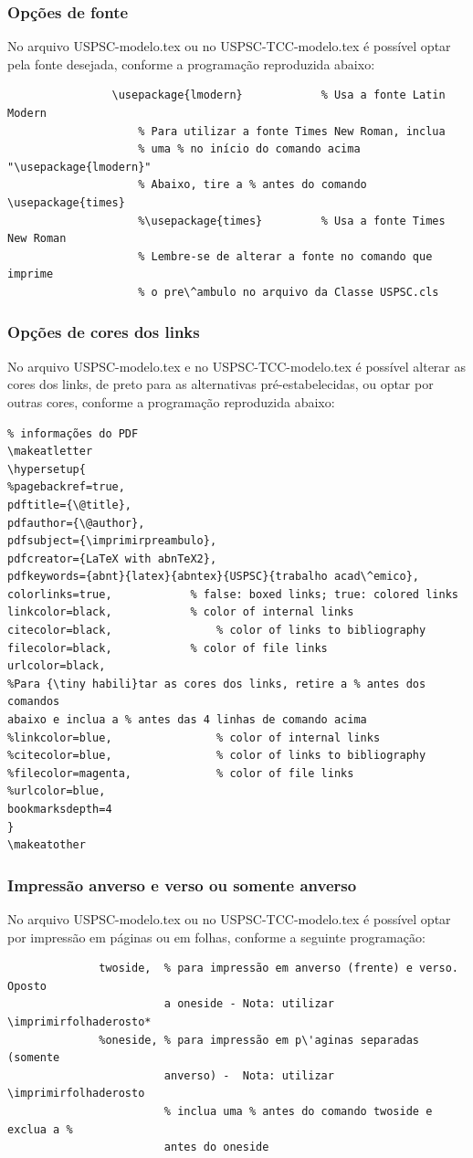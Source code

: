 \subsubsection{Opções de fonte} 
No arquivo USPSC-modelo.tex ou no USPSC-TCC-modelo.tex \'e possível optar pela fonte desejada, conforme a programação reproduzida abaixo:
				\begin{verbatim}
				\usepackage{lmodern}			% Usa a fonte Latin Modern
					% Para utilizar a fonte Times New Roman, inclua 
					% uma % no início do comando acima  "\usepackage{lmodern}"
					% Abaixo, tire a % antes do comando  \usepackage{times}
					%\usepackage{times}			% Usa a fonte Times New Roman
					% Lembre-se de alterar a fonte no comando que imprime 
					% o pre\^ambulo no arquivo da Classe USPSC.cls					
				\end{verbatim}
\subsubsection{Opções de cores dos links}\label{coreslinks} 
No arquivo USPSC-modelo.tex e no USPSC-TCC-modelo.tex \'e possível alterar as cores dos links, de preto para as alternativas pr\'e-estabelecidas, ou optar por outras cores, conforme a programação reproduzida abaixo:
\begin{verbatim}
% informações do PDF
\makeatletter
\hypersetup{
%pagebackref=true,
pdftitle={\@title}, 
pdfauthor={\@author},
pdfsubject={\imprimirpreambulo},
pdfcreator={LaTeX with abnTeX2},
pdfkeywords={abnt}{latex}{abntex}{USPSC}{trabalho acad\^emico}, 
colorlinks=true,       		% false: boxed links; true: colored links
linkcolor=black,          	% color of internal links
citecolor=black,        		% color of links to bibliography
filecolor=black,      		% color of file links
urlcolor=black,
%Para {\tiny habili}tar as cores dos links, retire a % antes dos comandos 
abaixo e inclua a % antes das 4 linhas de comando acima 
%linkcolor=blue,            	% color of internal links
%citecolor=blue,        		% color of links to bibliography
%filecolor=magenta,      		% color of file links
%urlcolor=blue,
bookmarksdepth=4	
}
\makeatother				
\end{verbatim}				
\subsubsection{Impressão anverso e verso ou somente anverso}
No arquivo USPSC-modelo.tex ou no USPSC-TCC-modelo.tex \'e possível optar por impressão em p\'aginas ou em folhas, conforme a seguinte programação:
			  \begin{verbatim}
			  twoside,  % para impressão em anverso (frente) e verso. Oposto 
			            a oneside - Nota: utilizar \imprimirfolhaderosto*
			  %oneside, % para impressão em p\'aginas separadas (somente 
			            anverso) -  Nota: utilizar \imprimirfolhaderosto
			            % inclua uma % antes do comando twoside e exclua a % 
			            antes do oneside 
			  \end{verbatim}			  
